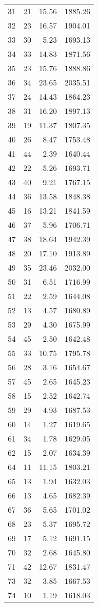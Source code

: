 \begin{appendix}
\begin{longtable}{rrrr}
31 & 21 & 15.56 & 1885.26 \\
32 & 23 & 16.57 & 1904.01 \\
33 & 30 & 5.23 & 1693.13 \\
34 & 33 & 14.83 & 1871.56 \\
35 & 23 & 15.76 & 1888.86 \\
36 & 34 & 23.65 & 2035.51 \\
37 & 24 & 14.43 & 1864.23 \\
38 & 31 & 16.20 & 1897.13 \\
39 & 19 & 11.37 & 1807.35 \\
40 & 26 & 8.47 & 1753.48 \\
41 & 44 & 2.39 & 1640.44 \\
42 & 22 & 5.26 & 1693.71 \\
43 & 40 & 9.21 & 1767.15 \\
44 & 36 & 13.58 & 1848.38 \\
45 & 16 & 13.21 & 1841.59 \\
46 & 37 & 5.96 & 1706.71 \\
47 & 38 & 18.64 & 1942.39 \\
48 & 20 & 17.10 & 1913.89 \\
49 & 35 & 23.46 & 2032.00 \\
50 & 31 & 6.51 & 1716.99 \\
51 & 22 & 2.59 & 1644.08 \\
52 & 13 & 4.57 & 1680.89 \\
53 & 29 & 4.30 & 1675.99 \\
54 & 45 & 2.50 & 1642.48 \\
55 & 33 & 10.75 & 1795.78 \\
56 & 28 & 3.16 & 1654.67 \\
57 & 45 & 2.65 & 1645.23 \\
58 & 15 & 2.52 & 1642.74 \\
59 & 29 & 4.93 & 1687.53 \\
60 & 14 & 1.27 & 1619.65 \\
61 & 34 & 1.78 & 1629.05 \\
62 & 15 & 2.07 & 1634.39 \\
64 & 11 & 11.15 & 1803.21 \\
65 & 13 & 1.94 & 1632.03 \\
66 & 13 & 4.65 & 1682.39 \\
67 & 36 & 5.65 & 1701.02 \\
68 & 23 & 5.37 & 1695.72 \\
69 & 17 & 5.12 & 1691.15 \\
70 & 32 & 2.68 & 1645.80 \\
71 & 42 & 12.67 & 1831.47 \\
73 & 32 & 3.85 & 1667.53 \\
74 & 10 & 1.19 & 1618.03 \\
\bottomrule
\end{longtable}


\end{appendix}
